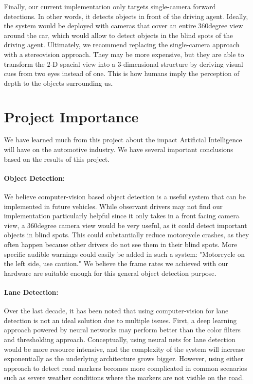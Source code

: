 Finally, our current implementation only targets single-camera forward detections. In other words, it detects objects in front of the driving agent. Ideally, the system would be deployed with cameras that cover an entire 360\-degree view around the car, which would allow to detect objects in the blind spots of the driving agent. Ultimately, we recommend replacing the single-camera approach with a stereovision approach. They may be more expensive, but they are able to transform the 2-D spacial view into a 3-dimensional structure by deriving visual cues from two eyes instead of one. This is how humans imply the perception of depth to the objects surrounding us. \par


\section{Project Importance}

We have learned much from this project about the impact Artificial Intelligence will have on the automotive industry.  We have several important conclusions based on the results of this project.

\paragraph{Object Detection:} We believe computer-vision based object detection is a useful system that can be implemented in future vehicles.  While observant drivers may not find our implementation particularly helpful since it only takes in a front facing camera view, a 360\-degree camera view would be very useful, as it could detect important objects in blind spots.  This could substantially reduce motorcycle crashes, as they often happen because other drivers do not see them in their blind spots.  More specific audible warnings could easily be added in such a system: "Motorcycle on the left side, use caution."  We believe the frame rates we achieved with our hardware are suitable enough for this general object detection purpose.


\paragraph{Lane Detection:} Over the last decade, it has been noted that using computer-vision for lane detection is not an ideal solution due to multiple issues. First, a deep learning approach powered by neural networks may perform better than the color filters and thresholding approach. Conceptually, using neural nets for lane detection would be more resource intensive, and the complexity of the system will increase exponentially as the underlying architecture grows bigger. However, using either approach to detect road markers becomes more complicated in common scenarios such as severe weather conditions where the markers are not visible on the road. 


